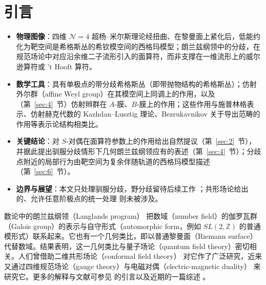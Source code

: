 

\section{引言}

\label{sec:1}

\begin{keytakeaways}
  \begin{itemize}[leftmargin=1.4em,itemsep=2pt,topsep=2pt]
    \item \textbf{物理图像}：四维 ${\mathcal N}=4$ 超杨–米尔斯理论经扭曲、在黎曼面上紧化后，低能约化为靶空间是希格斯丛的希钦模空间的西格玛模型；朗兰兹纲领中的分歧，在规范场论中对应沿余维二子流形引入的面算符，而非支撑在一维流形上的威尔逊算符或 't Hooft 算符。
    \item \textbf{数学工具}：具有单极点的带分歧希格斯丛（即带抛物结构的希格斯丛）；仿射外尔群（affine Weyl group）在其模空间上同调上的作用，以及（第~\ref{sec:4}~节）仿射辫群在 $A$-膜、$B$-膜上的作用；这些作用与施普林格表示、仿射赫克代数的 Kazhdan--Lusztig 理论、Bezrukavnikov 关于导出范畴的作用等表示论结构相类比。
    \item \textbf{关键结论}：对 $S$-对偶在面算符参数上的作用给出自然提议（第~\ref{sec:2}~节），并据此提出驯服分歧情形下几何朗兰兹纲领应有的表述（第~\ref{sec:4}~节）；分歧点附近的局部行为由靶空间为复余伴随轨道的西格玛模型描述（第~\ref{sec:6}~节）。
    \item \textbf{边界与展望}：本文只处理驯服分歧，野分歧留待后续工作 \cite{ref33}；共形场论给出的、允许任意阶极点的统一处理 \cite{ref6,ref7} 则未被涉及。
  \end{itemize}
\end{keytakeaways}

数论中的朗兰兹纲领（Langlands program）\cite{ref1} 把数域（number field）的伽罗瓦群（Galois group）的表示与自守形式（automorphic form，例如 $SL(2,\mathbb{Z})$ 的普通模形式）联系起来。它也有一个几何类比，即以普通黎曼面（Riemann surface）代替数域。结果表明，这一几何类比与量子场论（quantum field theory）密切相关。人们曾借助二维共形场论（conformal field theory）\cite{ref2,ref3,ref4,ref5,ref6} 对它作了广泛研究，近来又通过四维规范场论（gauge theory）与电磁对偶（electric-magnetic duality）\cite{ref8} 来研究它。更多的解释与文献可参见 \cite{ref8} 的引言以及近期的一篇综述 \cite{ref9}。

